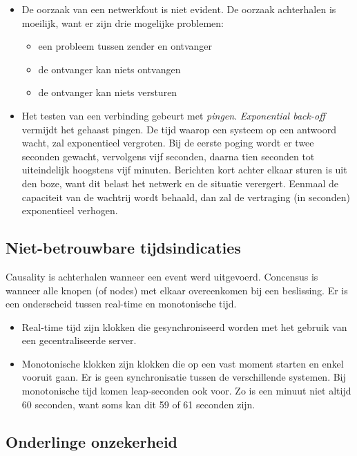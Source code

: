 \documentclass[a4paper,10pt,twoside]{report}
\begin{document}
\begin{itemize}
	\item De oorzaak van een netwerkfout is niet evident. De oorzaak achterhalen is moeilijk, want er zijn drie mogelijke problemen:
	\begin{itemize}
		\item een probleem tussen zender en ontvanger
		\item de ontvanger kan niets ontvangen 
		\item de ontvanger kan niets versturen
	\end{itemize}
	\item Het testen van een verbinding gebeurt met \textit{pingen}. \textit{Exponential back-off} vermijdt het gehaast pingen. De tijd waarop een systeem op een antwoord wacht, zal exponentieel vergroten. Bij de eerste poging wordt er twee seconden gewacht, vervolgens vijf seconden, daarna tien seconden tot uiteindelijk hoogstens vijf minuten. Berichten kort achter elkaar sturen is uit den boze, want dit belast het netwerk en de situatie verergert. Eenmaal de capaciteit van de wachtrij wordt behaald, dan zal de vertraging (in seconden) exponentieel verhogen.
\end{itemize}

\subsection{Niet-betrouwbare tijdsindicaties}

Causality is achterhalen wanneer een event werd uitgevoerd. Concensus is wanneer alle knopen (of nodes) met elkaar overeenkomen bij een beslissing. Er is een onderscheid tussen real-time en monotonische tijd. 

\begin{itemize}
	\item Real-time tijd zijn klokken die gesynchroniseerd worden met het gebruik van een gecentraliseerde server.
	\item Monotonische klokken zijn klokken die op een vast moment starten en enkel vooruit gaan. Er is geen synchronisatie tussen de verschillende systemen. Bij monotonische tijd komen leap-seconden ook voor. Zo is een minuut niet altijd 60 seconden, want soms kan dit 59 of 61 seconden zijn.
\end{itemize}

\subsection{Onderlinge onzekerheid}
\end{document}
